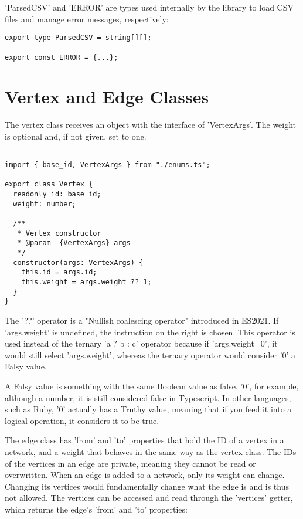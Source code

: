 'ParsedCSV' and 'ERROR' are types used internally by the library to load CSV files and manage error messages, respectively:

\begin{verbatim}
export type ParsedCSV = string[][];

export const ERROR = {...};
\end{verbatim}

\section{Vertex and Edge Classes}
The vertex class receives an object with the interface of 'VertexArgs'. The weight is optional and, if not given, set to one.

\begin{verbatim}

import { base_id, VertexArgs } from "./enums.ts";

export class Vertex {
  readonly id: base_id;
  weight: number;

  /**
   * Vertex constructor
   * @param  {VertexArgs} args
   */
  constructor(args: VertexArgs) {
    this.id = args.id;
    this.weight = args.weight ?? 1;
  }
}
\end{verbatim}

The '??' operator is a "Nullish coalescing operator" introduced in ES2021. If 'args.weight' is undefined, the instruction on the right is chosen. This operator is used instead of the ternary 'a ? b : c' operator because if 'args.weight=0', it would still select 'args.weight', whereas the ternary operator would consider '0' a Falsy value.

A Falsy value is something with the same Boolean value as false. '0', for example, although a number, it is still considered false in Typescript. In other languages, such as Ruby, '0' actually has a Truthy value, meaning that if you feed it into a logical operation, it considers it to be true.

The edge class has 'from' and 'to' properties that hold the ID of a vertex in a network, and a weight that behaves in the same way as the vertex class. The IDs of the vertices in an edge are private, meaning they cannot be read or overwritten.
When an edge is added to a network, only its weight can change. Changing its vertices would fundamentally change what the edge is and is thus not allowed. The vertices can be accessed and read through the 'vertices' getter, which returns the edge's 'from' and 'to' properties:

